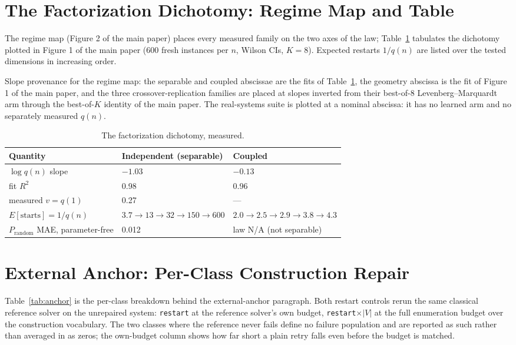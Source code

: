 \section{The Factorization Dichotomy: Regime Map and Table}
\label{app:law}

The regime map (Figure 2 of the main paper) places every measured family on the
two axes of the law; Table~\ref{tab:law} tabulates the dichotomy plotted in
Figure 1 of the main paper (600 fresh instances per $n$, Wilson CIs, $K = 8$). Expected restarts
$1/q(n)$ are listed over the tested dimensions in increasing order.

Slope provenance for the regime map: the separable and coupled abscissae are the fits of
Table~\ref{tab:law}, the geometry abscissa is the fit of Figure 1 of the main paper, and the
three crossover-replication families are placed at slopes inverted from their best-of-8
Levenberg--Marquardt arm through the best-of-$K$ identity of the main paper. The real-systems suite is plotted
at a nominal abscissa: it has no learned arm and no separately measured $q(n)$.


\begin{table}[ht]
\centering
\caption{The factorization dichotomy, measured.}
\label{tab:law}
\small
\begin{tabular}{lll}
\toprule
Quantity & Independent (separable) & Coupled \\
\midrule
$\log q(n)$ slope & $-1.03$ & $-0.13$ \\
fit $R^2$ & 0.98 & 0.96 \\
measured $v = q(1)$ & 0.27 & --- \\
$E[\text{starts}] = 1/q(n)$ & $3.7 \to 13 \to 32 \to 150 \to 600$ & $2.0 \to 2.5 \to 2.9 \to 3.8 \to 4.3$ \\
$P_{\text{random}}$ MAE, parameter-free & 0.012 & law N/A (not separable) \\
\bottomrule
\end{tabular}
\end{table}

\section{External Anchor: Per-Class Construction Repair}
\label{app:anchor}

Table~\ref{tab:anchor} is the per-class breakdown behind the external-anchor paragraph.
Both restart controls rerun the same classical reference solver on the unrepaired system:
\texttt{restart} at the reference solver's own budget, \texttt{restart}$\times|V|$ at the
full enumeration budget over the construction vocabulary. The two classes where the reference
never fails define no failure population and are reported as such rather than averaged in as
zeros; the own-budget column shows how
far short a plain retry falls even before the budget is matched.

